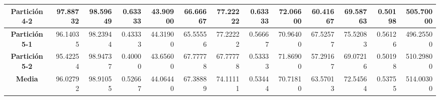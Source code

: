 \documentclass[a4paper,11pt]{article}
\begin{document}
\begin{table}[H]
\begin{adjustbox}{width=1.1\textwidth}
\begin{tabular}{|c|r|r|r|r|r|r|r|r|r|r|r|r|}
    \textbf{Partición 4-2} & 97.88732 & 98.59649 & 0.63333 & 43.90900 & 66.66667 & 77.22222 & 0.63333 & 72.06600 & 60.41667 & 69.58763 & 0.50198 & 505.70000 \\ \hline
    \textbf{Partición 5-1} & 96.14035 & 98.23944 & 0.43333 & 44.31900 & 65.55556 & 77.22222 & 0.56667 & 70.96400 & 67.52577 & 75.52083 & 0.56126 & 496.25500 \\ \hline
    \textbf{Partición 5-2} & 95.42254 & 98.94737 & 0.40000 & 43.65600 & 67.77778 & 67.77778 & 0.53333 & 71.86900 & 57.29167 & 69.07216 & 0.50198 & 510.29800 \\ \hline
    \textbf{Media} & 96.02792 & 98.91055 & 0.52667 & 44.06440 & 67.38889 & 74.11111 & 0.53444 & 70.71810 & 63.57013 & 72.54564 & 0.53755 & 514.00300 \\ \hline
  \end{tabular}
    \end{adjustbox}
    \label{BT}
  \end{table}  
  
\end{document}
